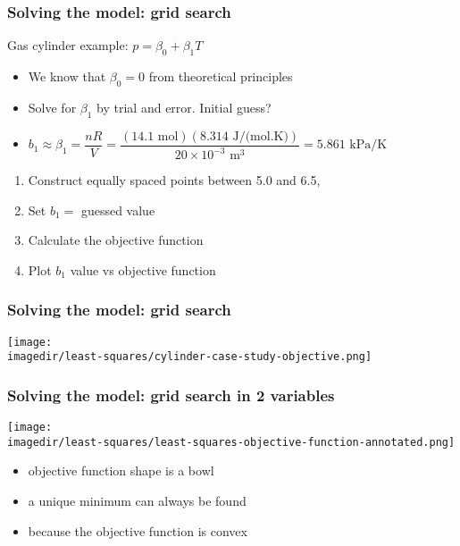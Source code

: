 \begin{frame}\frametitle{Solving the model: grid search}
	
	Gas cylinder example: $p = \beta_0 + \beta_1 T$ 
	\begin{itemize}
		\item	We know that $\beta_0 = 0$ from theoretical principles 
		\item	Solve for $\beta_1$ by trial and error. Initial guess? 
		\item	$b_1 \approx \beta_1 = \dfrac{nR}{V} = \dfrac{(14.1 \,\, \text{mol})(8.314 \,\,\text{J/(mol.K)})}{20 \times 10^{-3} \,\,\text{m}^3} = 5.861 \,\,\text{kPa/K}$ 
	\end{itemize}
	\begin{enumerate}
		\item	Construct equally spaced points between 5.0 and 6.5, 
		\item	Set $b_1 = $ guessed value 
		\item	Calculate the objective function 
		\item	Plot $b_1$ value vs objective function 
	\end{enumerate}
\end{frame}

\begin{frame}\frametitle{Solving the model: grid search}
	\begin{center}
		\texttt{[image: \\imagedir/least-squares/cylinder-case-study-objective.png]}
	\end{center}
\end{frame}

\begin{frame}\frametitle{Solving the model: grid search in 2 variables}
	\begin{center}
		\texttt{[image: \\imagedir/least-squares/least-squares-objective-function-annotated.png]}
	\end{center}
	\begin{itemize}
		\item	objective function shape is a bowl 
		\item	a unique minimum can always be found 
		\item	because the objective function is convex 
	\end{itemize}
\end{frame}

